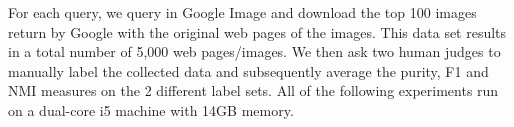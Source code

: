 For each query, we query in Google Image and
download the top 100 images return by Google with the original web pages of the images.
This data set results in a total number of 5,000 web pages/images.
We then ask two human judges to manually label the collected data and
subsequently average the purity, F1 and NMI measures on the
2 different label sets.
All of the following experiments run on a dual-core i5 machine
with 14GB memory.


